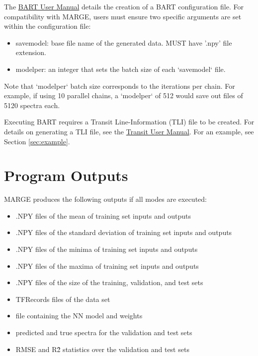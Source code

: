 \documentclass[letterpaper, 12pt]{article}
\begin{document}
The \href{https://exosports.github.io/BART/doc/BART_User_Manual.html}{BART User Manual} details the creation of a BART configuration file.  For 
compatibility with MARGE, users must ensure two specific arguments are set 
within the configuration file:
\begin{itemize}
\item savemodel: base file name of the generated data. MUST have '.npy' file 
                 extension.
\item modelper: an integer that sets the batch size of each `savemodel` file.
\end{itemize}

\noindent Note that `modelper` batch size corresponds to the iterations per 
chain.  For example, if using 10 parallel chains, a `modelper` of 512 would 
save out files of 5120 spectra each.

\noindent  Executing BART requires a Transit Line-Information (TLI) file to 
be created.  For details on generating a TLI file, see the \href{https://exosports.github.io/transit/doc/Transit_User_Manual.html}{Transit User Manual}.
For an example, see Section \ref{sec:example}.



\section{Program Outputs}
\label{sec:outputs}

MARGE produces the following outputs if all modes are executed:

\begin{itemize}
\item .NPY files of the mean of training set inputs and outputs
\item .NPY files of the standard deviation of training set inputs and outputs
\item .NPY files of the minima of training set inputs and outputs
\item .NPY files of the maxima of training set inputs and outputs
\item .NPY files of the size of the training, validation, and test sets
\item TFRecords files of the data set
\item file containing the NN model and weights
\item predicted and true spectra for the validation and test sets
\item RMSE and R\^2 statistics over the validation and test sets
\end{itemize}
\end{document}
